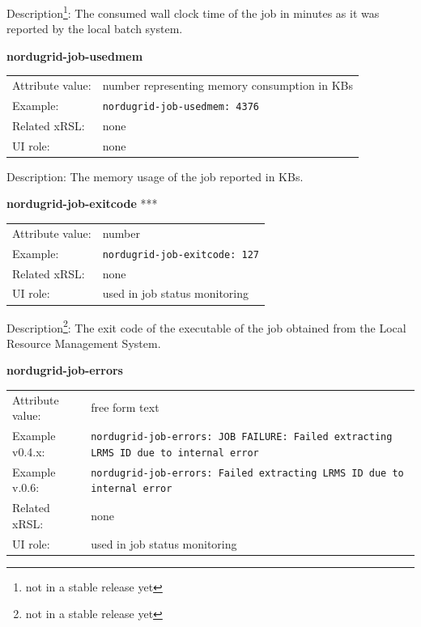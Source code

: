 \documentclass{article}
\begin{document}
Description\footnote{not in a stable release yet}: The consumed wall clock time of the job in minutes as it was reported by the 
local batch system.


  \hspace*{0.5cm}
  \begin{shaded}
    \textbf{nordugrid-job-usedmem}
  \end{shaded}
  \begin{tabular}{lp{10cm}}  
    Attribute value:& number representing memory consumption in KBs\\
    Example:& \verb#nordugrid-job-usedmem: 4376#\\
    Related xRSL:& none\\
    UI role:& none\\
  \end{tabular}

Description: The memory usage of the job reported in KBs.



  \hspace*{0.5cm}
  \begin{shaded}
    \textbf{nordugrid-job-exitcode} ***
  \end{shaded}
  \begin{tabular}{lp{10cm}}  
    Attribute value:& number\\
    Example:& \verb#nordugrid-job-exitcode: 127#\\
    Related xRSL:& none\\
    UI role:& used in job status monitoring\\
  \end{tabular}

Description\footnote{not in a stable release yet}: The exit code of the executable of the job obtained from the 
Local Resource Management System.



  \hspace*{0.5cm}
  \begin{shaded}
    \textbf{nordugrid-job-errors}
  \end{shaded}
  \begin{tabular}{lp{10cm}}  
    Attribute value:& free form text\\
    Example v0.4.x:& \verb#nordugrid-job-errors: JOB FAILURE: Failed extracting LRMS ID due to internal error#\\
    Example v.0.6:& \verb#nordugrid-job-errors: Failed extracting LRMS ID due to internal error#\\
    Related xRSL:& none\\
    UI role:& used in job status monitoring\\
  \end{tabular}
\end{document}
